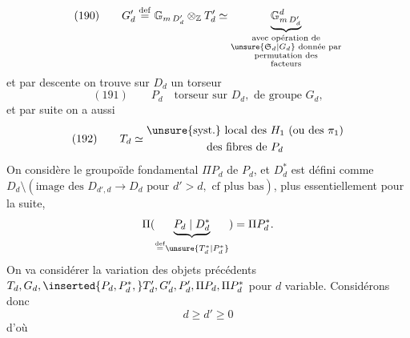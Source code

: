 \[
(190)\qquad G'_d\overset{\mathrm{def}}{=}\mathbb G_{m\,D'_d}\otimes_{\mathbb Z}T'_d\simeq\underbrace{\mathbb G^{d}_{m\,D'_d}}_{\substack{\text{avec opération de}\\\unsure{\mathfrak S_d|G_d}\text{ donnée par}\\\text{permutation des}\\\text{facteurs}}}
\]
et par descente on trouve sur $D_d$ un torseur
\[
(191)\qquad P_d\quad\text{torseur sur }D_d,\text{ de groupe }G_d,
\]
et par suite on a aussi
\[
(192)\qquad T_d\simeq\begin{gathered}\text{\unsure{syst.} local des }H_1\text{ (ou des }\pi_1\text{)}\\\text{des fibres de }P_d
\end{gathered}
\]
On considère le groupoïde fondamental $\Pi P_d$ de $P_d$, et   $D_d^*$ est défini comme $D_d\setminus(\text{image des }D_{d',d}\longrightarrow D_d\text{ pour }d'>d,\text{ cf plus bas})$, plus essentiellement pour la suite,
\[
\Pi(\underbrace{P_d\mid D_d^*}_{\overset{\mathrm{def}}{=}\unsure{T_d^*|P_d^*}})=\Pi P_d^*.
\]
On va considérer la variation des objets précédents $T_d,G_d,\inserted{P_d,P_d^*,}T'_d,G'_d,P'_d,\Pi P_d,\Pi P_d^*$ pour $d$ variable. Considérons donc 
\[
d\geq d'\geq0
\]
d'où 
